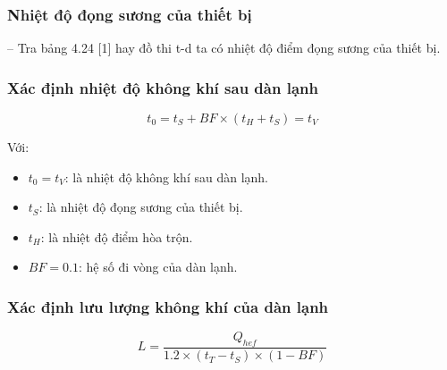 \subsubsection{Nhiệt độ đọng sương của thiết bị}
-- Tra bảng 4.24 [1] hay đồ thi t-d ta có nhiệt độ điểm đọng sương của thiết bị.
\subsubsection{Xác định nhiệt độ không khí sau dàn lạnh}
\begin{equation*}
	t_{0} = t_{S} + BF\times (t_{H} + t_{S}) = t_{V}
\end{equation*}

Với:
\begin{itemize}
	\item $t_{0} = t_{V}$: là nhiệt độ không khí sau dàn lạnh.
	\item $t_{S}$: là nhiệt độ đọng sương của thiết bị.
	\item $t_{H}$:  là nhiệt độ điểm hòa trộn.
	\item $BF = 0.1$: hệ số đi vòng của dàn lạnh.
\end{itemize}
\subsubsection{Xác định lưu lượng không khí của dàn lạnh}
\begin{equation*}
	L = \dfrac{Q_{hef}}{1.2\times (t_{T} - t_{S})\times (1-BF)}
\end{equation*}

